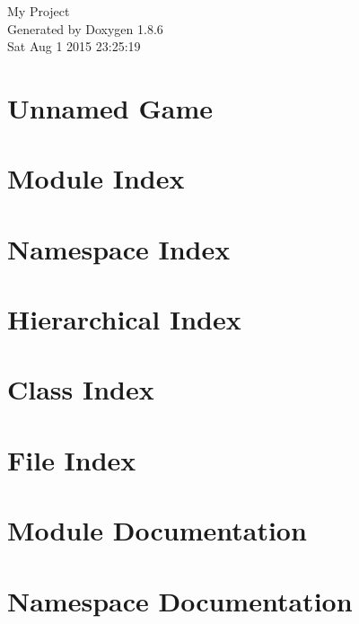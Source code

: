 \documentclass[twoside]{book}
\newcommand{\clearemptydoublepage}{%
  \newpage{\pagestyle{empty}\cleardoublepage}%
}
\begin{document}
\hypersetup{pageanchor=false}
\begin{titlepage}
\vspace*{7cm}
\begin{center}%
{\Large My Project }\\
\vspace*{1cm}
{\large Generated by Doxygen 1.8.6}\\
\vspace*{0.5cm}
{\small Sat Aug 1 2015 23:25:19}\\
\end{center}
\end{titlepage}
\clearemptydoublepage
\tableofcontents
\clearemptydoublepage
{}
\hypersetup{pageanchor=true}

\chapter{Unnamed Game}
\label{index}\hypertarget{index}{}
\chapter{Module Index}

\chapter{Namespace Index}

\chapter{Hierarchical Index}

\chapter{Class Index}

\chapter{File Index}

\chapter{Module Documentation}





\chapter{Namespace Documentation}







\end{document}
